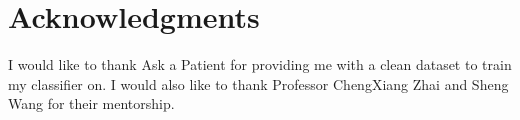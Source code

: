 \documentclass{acm_proc_article-sp}
\begin{document}
\section{Acknowledgments}
I would like to thank Ask a Patient for providing me with a clean dataset to train my classifier on. I would also like to thank Professor ChengXiang Zhai and Sheng Wang for their mentorship. 
%

%
%

\end{document}

